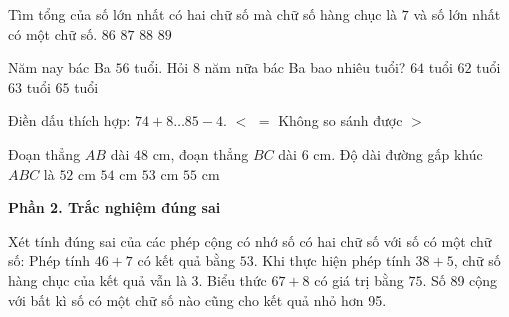 \begin{ex} %
Tìm tổng của số lớn nhất có hai chữ số mà chữ số hàng chục là $7$ và số lớn nhất có một chữ số.
\choice
{$86$}
{$87$}
{\True $88$}
{$89$}
\end{ex}

\begin{ex} %
Năm nay bác Ba $56$ tuổi. Hỏi $8$ năm nữa bác Ba bao nhiêu tuổi?
\choice
{\True $64$ tuổi}
{$62$ tuổi}
{$63$ tuổi}
{$65$ tuổi}
\end{ex}

\begin{ex} %
Điền dấu thích hợp: $74 + 8 \dots 85 - 4$.
\choice
{$<$}
{$=$}
{Không so sánh được}
{\True $>$}
\end{ex}

\begin{ex} %
Đoạn thẳng $AB$ dài $48\text{ cm}$, đoạn thẳng $BC$ dài $6\text{ cm}$. Độ dài đường gấp khúc $ABC$ là
\choice
{$52\text{ cm}$}
{\True $54\text{ cm}$}
{$53\text{ cm}$}
{$55\text{ cm}$}
\end{ex}

\textbf{Phần 2. Trắc nghiệm đúng sai}

\begin{ex} %
Xét tính đúng sai của các phép cộng có nhớ số có hai chữ số với số có một chữ số:
\choiceTF
{\True Phép tính $46 + 7$ có kết quả bằng $53$.}
{Khi thực hiện phép tính $38 + 5$, chữ số hàng chục của kết quả vẫn là 3.}
{\True Biểu thức $67 + 8$ có giá trị bằng $75$.}
{Số 89 cộng với bất kì số có một chữ số nào cũng cho kết quả nhỏ hơn 95.}
\end{ex}

